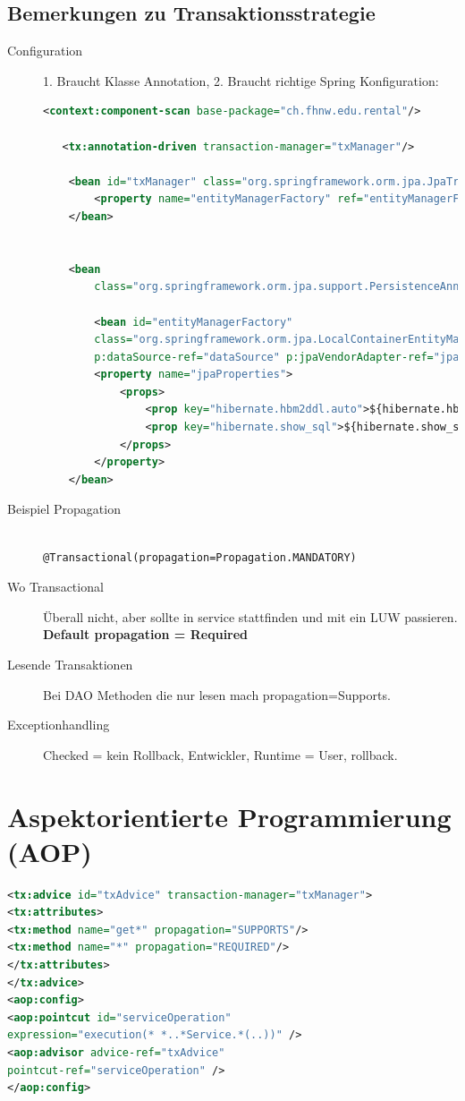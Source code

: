 \documentclass[a4paper,10pt]{scrreprt}
\begin{document}
\section{Bemerkungen zu Transaktionsstrategie}
\begin{description}
 \item [Configuration] 1. Braucht Klasse Annotation, 2. Braucht richtige Spring Konfiguration: \\
 \begin{lstlisting}[caption=spring config transaction,language=xml]
  <context:component-scan base-package="ch.fhnw.edu.rental"/>
  
   <tx:annotation-driven transaction-manager="txManager"/>
  
	<bean id="txManager" class="org.springframework.orm.jpa.JpaTransactionManager">
		<property name="entityManagerFactory" ref="entityManagerFactory" />
	</bean>
	
	
	<bean
		class="org.springframework.orm.jpa.support.PersistenceAnnotationBeanPostProcessor" />
		
		<bean id="entityManagerFactory"
		class="org.springframework.orm.jpa.LocalContainerEntityManagerFactoryBean"
		p:dataSource-ref="dataSource" p:jpaVendorAdapter-ref="jpaAdapter">
		<property name="jpaProperties">
			<props>
				<prop key="hibernate.hbm2ddl.auto">${hibernate.hbm2ddl.auto}</prop>
				<prop key="hibernate.show_sql">${hibernate.show_sql}</prop>
			</props>
		</property>
	</bean>
 \end{lstlisting}
\item[Beispiel Propagation] \begin{verbatim}
                             @Transactional(propagation=Propagation.MANDATORY)
                            \end{verbatim}
\item[Wo Transactional] Überall nicht, aber sollte in service stattfinden und mit ein LUW passieren. \textbf{Default 
propagation = Required} 
\item[Lesende Transaktionen] Bei DAO Methoden die nur lesen mach propagation=Supports.
\item [Exceptionhandling] Checked = kein Rollback, Entwickler, Runtime = User, rollback.
\end{description}


\chapter{Aspektorientierte Programmierung (AOP)}
\begin{lstlisting}[caption=AOP Config,language=xml]
 <tx:advice id="txAdvice" transaction-manager="txManager">
<tx:attributes>
<tx:method name="get*" propagation="SUPPORTS"/>
<tx:method name="*" propagation="REQUIRED"/>
</tx:attributes>
</tx:advice>
<aop:config>
<aop:pointcut id="serviceOperation"
expression="execution(* *..*Service.*(..))" />
<aop:advisor advice-ref="txAdvice"
pointcut-ref="serviceOperation" />
</aop:config>
\end{lstlisting}
\end{document}
